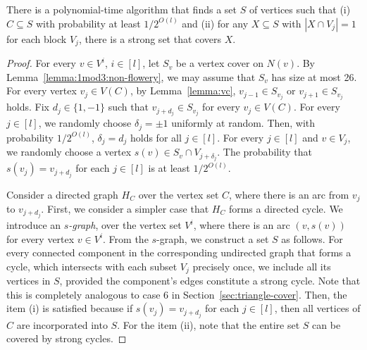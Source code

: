 \begin{lemma} \label{lemma:1mod3:ultimate}
  There is a polynomial-time algorithm that finds a set $S$ of vertices such that (i) $C \subseteq S$ with probability at least $1/2^{O(l)}$ and (ii) for any $X \subseteq S$ with $|X \cap V_j| = 1$ for each block $V_j$, there is a strong set that covers $X$.
\end{lemma}
\begin{proof}
  For every $v \in V^i$, $i \in [l]$, let $S_v$ be a vertex cover on $N(v)$.
  By Lemma~\ref{lemma:1mod3:non-flowery}, we may assume that $S_v$ has size at most 26.
  For every vertex $v_j \in V(C)$, by Lemma~\ref{lemma:vc}, $v_{j-1} \in S_{v_j}$ or $v_{j+1} \in S_{v_j}$ holds.
  Fix $d_j \in \{ 1, -1 \}$ such that $v_{j+d_j} \in S_{v_j}$ for every $v_j \in V(C)$.
  For every $j \in [l]$, we randomly choose $\delta_j = \pm 1$ uniformly at random.
  Then, with probability $1/2^{O(l)}$, $\delta_j = d_j$ holds for all $j \in [l]$.
  For every $j \in [l]$ and $v \in V_j$, we randomly choose a vertex $s(v) \in S_v \cap V_{j+\delta_j}$.
  The probability that $s(v_j) = v_{j+d_j}$ for each $j \in [l]$ is at least $1/2^{O(l)}$.
  
  Consider a directed graph $H_C$ over the vertex set $C$, where there is an arc from $v_{j}$ to $v_{j+d_j}$.
  First, we consider a simpler case that $H_C$ forms a directed cycle.
  We introduce an \emph{$s$-graph}, over the vertex set $V^i$, where there is an arc $(v, s(v))$ for every vertex $v \in V^i$.
  From the $s$-graph, we construct a set $S$ as follows.
  For every connected component in the corresponding undirected graph that forms a cycle, which intersects with each subset $V_j$ precisely once, we include all its vertices in $S$, provided the component's edges constitute a strong cycle.
  Note that this is completely analogous to case 6 in Section~\ref{sec:triangle-cover}.
  Then, the item (i) is satisfied because if $s(v_j) = v_{j+d_j}$ for each $j \in [l]$, then all vertices of $C$ are incorporated into $S$.
  For the item (ii), note that the entire set $S$ can be covered by strong cycles.


\end{proof}
